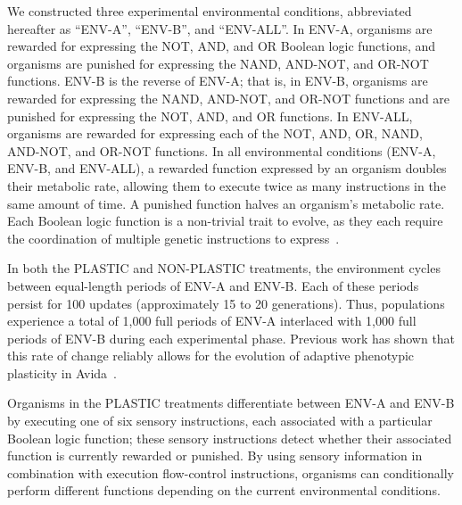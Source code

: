 \begin{raggedbottom}

We constructed three experimental environmental conditions, abbreviated hereafter as ``ENV-A'', ``ENV-B'', and ``ENV-ALL''.
In ENV-A, organisms are rewarded for expressing the NOT, AND, and OR Boolean logic functions, and organisms are punished for expressing the NAND, AND-NOT, and OR-NOT functions. 
ENV-B is the reverse of ENV-A; that is, in ENV-B, organisms are rewarded for expressing the NAND, AND-NOT, and OR-NOT functions and are punished for expressing the NOT, AND, and OR functions.
In ENV-ALL, organisms are rewarded for expressing each of the NOT, AND, OR, NAND, AND-NOT, and OR-NOT functions.
In all environmental conditions (ENV-A, ENV-B, and ENV-ALL), a rewarded function expressed by an organism doubles their metabolic rate, allowing them to execute twice as many instructions in the same amount of time.
A punished function halves an organism's metabolic rate.
Each Boolean logic function is a non-trivial trait to evolve, as they each require the coordination of multiple genetic instructions to express~\citep{lenski_evolutionary_2003}.


In both the PLASTIC and NON-PLASTIC treatments, the environment cycles between equal-length periods of ENV-A and ENV-B.
Each of these periods persist for 100 updates (approximately 15 to 20 generations).
Thus, populations experience a total of 1,000 full periods of ENV-A interlaced with 1,000 full periods of ENV-B during each experimental phase.
Previous work has shown that this rate of change reliably allows for the evolution of adaptive phenotypic plasticity in Avida~\citep{clune_investigating_2007,lalejini_evolutionary_2016}.

Organisms in the PLASTIC treatments differentiate between ENV-A and ENV-B by executing one of six sensory instructions, each associated with a particular Boolean logic function; these sensory instructions detect whether their associated function is currently rewarded or punished.
By using sensory information in combination with execution flow-control instructions, organisms can conditionally perform different functions depending on the current environmental conditions.


\end{raggedbottom}
